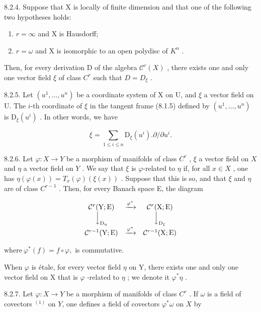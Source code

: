 8.2.4. Suppose that X is locally of finite dimension and that one of the following two hypotheses holds:

\begin{enumerate}
\def\labelenumi{(\roman{enumi})}
\item
  \(r = \infty\) and X is Hausdorff;
\item
  \(r = \omega\) and X is isomorphic to an open polydisc of \(K^{n}\) .
\end{enumerate}

Then, for every derivation D of the algebra \(\mathcal{C}^r(X)\) , there exists one and only one vector field \(\xi\) of class \(C^r\) such that \(D = D_{\xi}\) .

8.2.5. Let \((u^{1},\ldots ,u^{n})\) be a coordinate system of X on U, and \(\xi\) a vector field on U. The \(i\)-th coordinate of \(\xi\) in the tangent frame (8.1.5) defined by \((u^{1},\ldots ,u^{n})\) is \(\mathrm{D}_{\xi}(u^i)\) . In other words, we have

\[
\xi = \sum_ {1 \leqslant i \leqslant n} \mathrm{D} _ {\xi} (u ^ {i}). \partial / \partial u ^ {i}.
\]

8.2.6. Let \(\varphi: X \to Y\) be a morphism of manifolds of class \(C^r\) , \(\xi\) a vector field on \(X\) and \(\eta\) a vector field on \(Y\) . We say that \(\xi\) is \(\varphi\)-related to \(\eta\) if, for all \(x \in X\) , one has \(\eta(\varphi(x)) = T_x(\varphi)(\xi(x))\) . Suppose that this is so, and that \(\xi\) and \(\eta\) are of class \(C^{r-1}\) . Then, for every Banach space E, the diagram

\[
\begin{array}{c c c} \mathcal {C} ^ {r} (\mathrm{Y}; \mathrm{E}) & \xrightarrow {\varphi^ {*}} & \mathcal {C} ^ {r} (\mathrm{X}; \mathrm{E}) \\ \Big \downarrow_ {\mathrm{D} _ {\eta}} & & \Big \downarrow_ {\mathrm{D} _ {\xi}} \\ \mathcal {C} ^ {r - 1} (\mathrm{Y}; \mathrm{E}) & \xrightarrow {\varphi^ {*}} & \mathcal {C} ^ {r - 1} (\mathrm{X}; \mathrm{E}) \end{array}
\]

\(\mathrm{where}\ \varphi^{*}(f) = f\circ \varphi ,\) is commutative.

When \(\varphi\) is étale, for every vector field \(\eta\) on Y, there exists one and only one vector field on X that is \(\varphi\) -related to \(\eta\) ; we denote it \(\varphi^{*}\eta\) .

8.2.7. Let \(\varphi: X \to Y\) be a morphism of manifolds of class \(C^r\) . If \(\omega\) is a field of covectors \(^{(1)}\) on \(Y\), one defines a field of covectors \(\varphi^*\omega\) on \(X\) by

